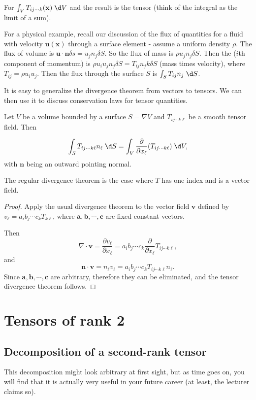 \documentclass[a4paper]{article}
\begin{document}
For $\int_V T_{ij\cdots k}(\mathbf{x})\;\d V$ and the result is the tensor (think of the integral as the limit of a sum).

For a physical example, recall our discussion of the flux of quantities for a fluid with velocity $\mathbf{u}(\mathbf{x})$ through a surface element - assume a uniform density $\rho$. The flux of volume is $\mathbf{u}\cdot \mathbf{n}\delta s = u_j n_j \delta S$. So the flux of mass is $\rho u_j n_j \delta S$. Then the ($i$th component of momentum) is $\rho u_i u_j n_j \delta S = T_{ij}n_jk \delta S$ (mass times velocity), where $T_{ij} = \rho u_iu_j$. Then the flux through the surface $S$ is $\int_S T_{ij}n_j \;\d S$.

It is easy to generalize the divergence theorem from vectors to tensors. We can then use it to discuss conservation laws for tensor quantities.

Let $V$ be a volume bounded by a surface $S=\nabla V$ and $T_{ij\cdots k\ell}$ be a smooth tensor field. Then

\begin{thm}
  \[
    \int_S T_{ij\cdots k\ell}n_\ell\;\d S = \int_V \frac{\partial}{\partial x_\ell}(T_{ij\cdots k\ell})\;\d V,
  \]
  with $\mathbf{n}$ being an outward pointing normal.
\end{thm}
The regular divergence theorem is the case where $T$ has one index and is a vector field.

\begin{proof}
  Apply the usual divergence theorem to the vector field $\mathbf{v}$ defined by $v_\ell = a_i b_j \cdots c_k T_{k\ell}$, where $\mathbf{a}, \mathbf{b}, \cdots, \mathbf{c}$ are fixed constant vectors.

  Then
  \[
    \nabla\cdot \mathbf{v} = \frac{\partial v_\ell}{\partial x_\ell} = a_i b_j \cdots c_k \frac{\partial}{\partial x_\ell}T_{ij\cdots k\ell},
  \]
  and
  \[
    \mathbf{n}\cdot \mathbf{v} = n_\ell v_\ell = a_i b_j \cdots c_k T_{ij\cdots k\ell }n_\ell.
  \]
  Since $\mathbf{a}, \mathbf{b}, \cdots, \mathbf{c}$ are arbitrary, therefore they can be eliminated, and the tensor divergence theorem follows.
\end{proof}
\section{Tensors of rank 2}
\subsection{Decomposition of a second-rank tensor}
This decomposition might look arbitrary at first sight, but as time goes on, you will find that it is actually very useful in your future career (at least, the lecturer claims so).
\end{document}
